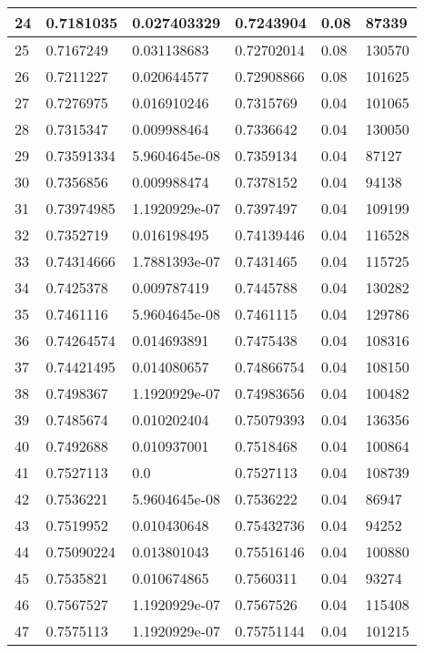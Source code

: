 \begin{longtable}{|l|l|l|l|l|l|}
24 & 0.7181035 & 0.027403329 & 0.7243904 & 0.08 & 87339 \\ \hline 
25 & 0.7167249 & 0.031138683 & 0.72702014 & 0.08 & 130570 \\ \hline 
26 & 0.7211227 & 0.020644577 & 0.72908866 & 0.08 & 101625 \\ \hline 
27 & 0.7276975 & 0.016910246 & 0.7315769 & 0.04 & 101065 \\ \hline 
28 & 0.7315347 & 0.009988464 & 0.7336642 & 0.04 & 130050 \\ \hline 
29 & 0.73591334 & 5.9604645e-08 & 0.7359134 & 0.04 & 87127 \\ \hline 
30 & 0.7356856 & 0.009988474 & 0.7378152 & 0.04 & 94138 \\ \hline 
31 & 0.73974985 & 1.1920929e-07 & 0.7397497 & 0.04 & 109199 \\ \hline 
32 & 0.7352719 & 0.016198495 & 0.74139446 & 0.04 & 116528 \\ \hline 
33 & 0.74314666 & 1.7881393e-07 & 0.7431465 & 0.04 & 115725 \\ \hline 
34 & 0.7425378 & 0.009787419 & 0.7445788 & 0.04 & 130282 \\ \hline 
35 & 0.7461116 & 5.9604645e-08 & 0.7461115 & 0.04 & 129786 \\ \hline 
36 & 0.74264574 & 0.014693891 & 0.7475438 & 0.04 & 108316 \\ \hline 
37 & 0.74421495 & 0.014080657 & 0.74866754 & 0.04 & 108150 \\ \hline 
38 & 0.7498367 & 1.1920929e-07 & 0.74983656 & 0.04 & 100482 \\ \hline 
39 & 0.7485674 & 0.010202404 & 0.75079393 & 0.04 & 136356 \\ \hline 
40 & 0.7492688 & 0.010937001 & 0.7518468 & 0.04 & 100864 \\ \hline 
41 & 0.7527113 & 0.0 & 0.7527113 & 0.04 & 108739 \\ \hline 
42 & 0.7536221 & 5.9604645e-08 & 0.7536222 & 0.04 & 86947 \\ \hline 
43 & 0.7519952 & 0.010430648 & 0.75432736 & 0.04 & 94252 \\ \hline 
44 & 0.75090224 & 0.013801043 & 0.75516146 & 0.04 & 100880 \\ \hline 
45 & 0.7535821 & 0.010674865 & 0.7560311 & 0.04 & 93274 \\ \hline 
46 & 0.7567527 & 1.1920929e-07 & 0.7567526 & 0.04 & 115408 \\ \hline 
47 & 0.7575113 & 1.1920929e-07 & 0.75751144 & 0.04 & 101215 \\ \hline 

\end{longtable}
